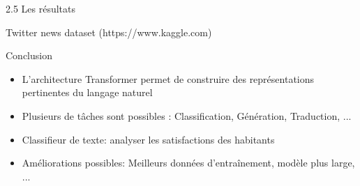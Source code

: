 \documentclass[12pt]{beamer}
\begin{document}

\begin{frame}{2.5 Les résultats}

\begin{center}
Twitter news dataset (https://www.kaggle.com)
\end{center}

\end{frame}




\begin{frame}{Conclusion}

\begin{itemize}
	\item L'architecture Transformer permet de construire des représentations pertinentes du langage naturel
	\vspace{8px}
	\item Plusieurs de tâches sont possibles : Classification, Génération, Traduction, ...
	\vspace{8px}
	\item Classifieur de texte: analyser les satisfactions des habitants
	\vspace{8px}
	\item Améliorations possibles: Meilleurs données d'entraînement, modèle plus large, ...
\end{itemize}


\end{frame}


\end{document}
